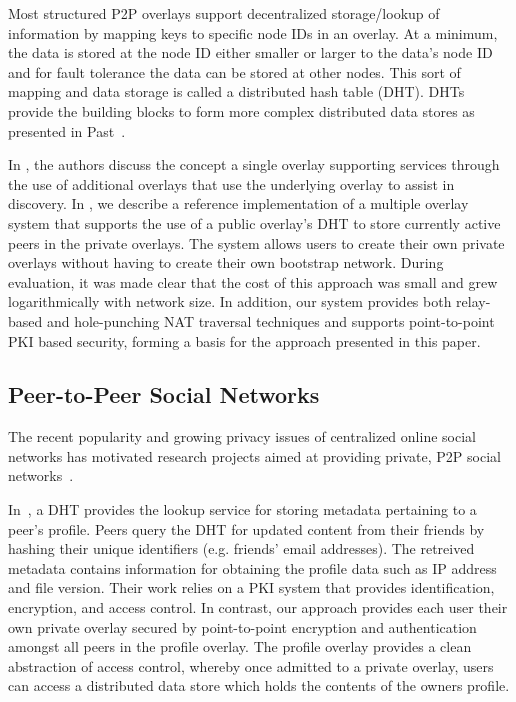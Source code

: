 \documentclass[letterpaper,twocolumn,10pt]{article}
\begin{document}
Most structured P2P overlays support decentralized storage/lookup of information by
mapping keys to specific node IDs in an overlay.  At a minimum, the data is stored
at the node ID either smaller or larger to the data's node ID and for fault
tolerance the data can be stored at other nodes.  This sort of mapping
and data storage is called a distributed hash table (DHT).  DHTs provide the
building blocks to form more complex distributed data stores as presented in
Past~\cite{past}.

In \cite{one_ring, randpeer, can_multicast}, the authors discuss the concept a
single overlay supporting services through the use of additional overlays
that use the underlying overlay to assist in discovery.  In \cite{icdcs10}, we
describe a reference implementation of a multiple overlay system that supports
the use of a public overlay's DHT to store currently active peers in the private
overlays. The system allows users to create their own private overlays without
having to create their own bootstrap network.  During evaluation, it was made
clear that the cost of this approach was small and grew logarithmically with
network size.  In addition, our system provides both relay-based
and hole-punching NAT traversal techniques and supports point-to-point PKI
based security, forming a basis for the approach presented in this paper.

\subsection{Peer-to-Peer Social Networks}
The recent popularity and growing privacy issues of centralized online social
networks has motivated research projects aimed at providing private, P2P social
networks~\cite{peerson, matryoshka, tribler-osn, vis-a-vis}.

In~\cite{peerson}, a DHT provides the lookup service for storing metadata
pertaining to a peer's profile. Peers query the DHT for updated content from 
their friends by hashing their unique identifiers (e.g. friends' email
addresses).  The retreived metadata contains information for obtaining the
profile data such as IP address and file version. Their work relies
on a PKI system that provides identification, encryption, and access control.
In contrast, our approach provides each user their own private overlay secured
by point-to-point encryption and authentication amongst all peers in the profile
overlay.  The profile overlay provides a clean abstraction of access control,
whereby once admitted to a private overlay, users can access a distributed data
store which holds the contents of the owners profile.
\end{document}

